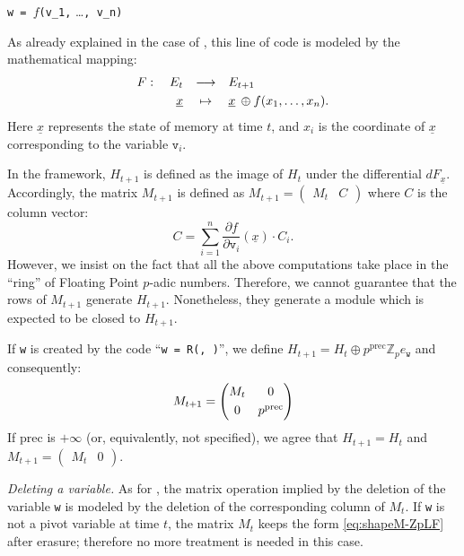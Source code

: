 \documentclass[sigconf]{acmart}
\newcommand{\Z}{\mathbb Z}
\newcommand{\Zp}{\Z_p}
\newcommand{\ttv}{\texttt{v}\xspace}
\newcommand{\ttw}{\texttt{w}\xspace}
\newcommand{\ZpLC}{\text{\rm \tt ZpLC}\xspace}
\newcommand{\ZpLF}{\text{\rm \tt ZpLF}\xspace}
\theoremstyle{definition}
\begin{document}
\medskip

\hfill\verb?w = ?$f$\verb?(v_1,? \ldots\verb?, v_n)?\hfill\null

\medskip

\noindent
As already explained in the case of \ZpLC, this line of code is 
modeled by the mathematical mapping:
$$\begin{array}{rcl}
F: \quad E_t & \longrightarrow & E_{t+1} \smallskip \\
\underline x & \mapsto & \underline x \:\oplus f(x_1, \ldots, x_n).
\end{array}$$
Here $\underline x$ represents the state of memory at time $t$, 
and $x_i$ is the coordinate of $\underline x$ corresponding to the
variable $\ttv_i$.

In the \ZpLF framework, $H_{t+1}$ is defined as the image of $H_t$
under the differential $dF_{\underline x}$. Accordingly, the matrix
$M_{t+1}$ is defined as $M_{t+1} = \left(\begin{matrix}
M_t & C \end{matrix}\right)$
where $C$ is the column vector:
$$C = \sum_{i=1}^n \frac{\partial f}{\partial{\ttv_i}} (\underline x)
\cdot C_i.$$
However, we insist on the fact that all the above computations take
place in the ``ring'' of Floating Point $p$-adic numbers. Therefore,
we cannot guarantee that the rows of $M_{t+1}$ generate $H_{t+1}$.
Nonetheless, they generate a module which is expected to be closed 
to $H_{t+1}$.

\smallskip

If \ttw is created by the code
``\verb?w = ?\verb?R(?\verb?, ?\verb?)?'',
we define $H_{t+1} = H_t \oplus p^{\text{prec}} \Zp e_\ttw$ and consequently:
$$M_{t+1} = \left(\begin{matrix}
M_t & 0 \smallskip \\ 0 & p^{\text{prec}}
\end{matrix}\right)$$
If $\text{prec}$ is $+\infty$ (or, equivalently, not specified), we
agree that $H_{t+1} = H_t$ and $M_{t+1} = (\begin{matrix} M_t & 0 
\end{matrix})$.

\medskip

\noindent \textit{Deleting a variable.} 
% 
As for \ZpLC, the matrix operation implied by the deletion of the 
variable \ttw is modeled by the deletion of the corresponding column 
of $M_t$. If \ttw is not a pivot variable at time $t$, the matrix 
$M_t$ keeps the form \eqref{eq:shapeM-ZpLF} after erasure; therefore
no more treatment is needed in this case.
\end{document}
